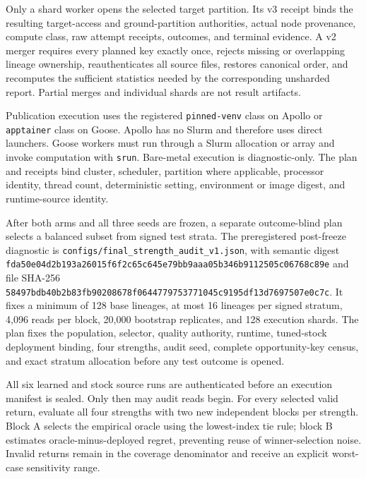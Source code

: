 \documentclass[11pt,a4paper]{article}
\newcommand{\code}[1]{\texttt{\small #1}}
\newcommand{\hexdigest}[8]{\code{#1}\allowbreak\code{#2}\allowbreak\code{#3}\allowbreak\code{#4}\allowbreak\code{#5}\allowbreak\code{#6}\allowbreak\code{#7}\allowbreak\code{#8}}
\theoremstyle{definition}\newtheorem{definition}[proposition]{Definition}
\begin{document}
Only a shard worker opens the selected target partition. Its v3 receipt binds the resulting target-access and ground-partition authorities, actual node provenance, compute class, raw attempt receipts, outcomes, and terminal evidence. A v2 merger requires every planned key exactly once, rejects missing or overlapping lineage ownership, reauthenticates all source files, restores canonical order, and recomputes the sufficient statistics needed by the corresponding unsharded report. Partial merges and individual shards are not result artifacts.

Publication execution uses the registered \code{pinned-venv} class on Apollo or \code{apptainer} class on Goose. Apollo has no Slurm and therefore uses direct launchers. Goose workers must run through a Slurm allocation or array and invoke computation with \code{srun}. Bare-metal execution is diagnostic-only. The plan and receipts bind cluster, scheduler, partition where applicable, processor identity, thread count, deterministic setting, environment or image digest, and runtime-source identity.

After both arms and all three seeds are frozen, a separate outcome-blind plan selects a balanced subset from signed test strata. The preregistered post-freeze diagnostic is \code{configs/final\_strength\_audit\_v1.json}, with semantic digest \hexdigest{fda50e04}{d2b193a2}{6015f6f2}{c65c645e}{79bb9aaa}{05b346b9}{112505c0}{6768c89e} and file SHA-256 \hexdigest{58497bdb}{40b2b83f}{b9020867}{8f064477}{97537710}{45c9195d}{f13d7697}{507e0c7c}. It fixes a minimum of 128 base lineages, at most 16 lineages per signed stratum, 4,096 reads per block, 20,000 bootstrap replicates, and 128 execution shards. The plan fixes the population, selector, quality authority, runtime, tuned-stock deployment binding, four strengths, audit seed, complete opportunity-key census, and exact stratum allocation before any test outcome is opened.

All six learned and stock source runs are authenticated before an execution manifest is sealed. Only then may audit reads begin. For every selected valid return, evaluate all four strengths with two new independent blocks per strength. Block A selects the empirical oracle using the lowest-index tie rule; block B estimates oracle-minus-deployed regret, preventing reuse of winner-selection noise. Invalid returns remain in the coverage denominator and receive an explicit worst-case sensitivity range.
\end{document}
